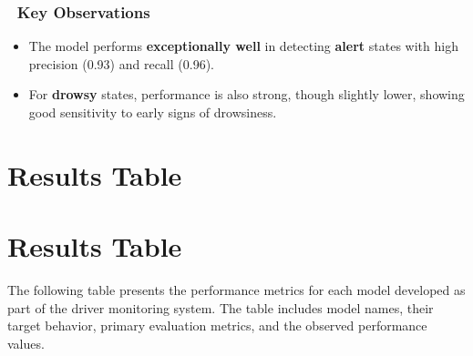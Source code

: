 \documentclass[
  letterpaper,
  DIV=11,
  numbers=noendperiod]{scrreport}
\providecommand{\tightlist}{%
  \setlength{\itemsep}{0pt}\setlength{\parskip}{0pt}}
\begin{document}
\subsubsection{📌 Key Observations}\label{key-observations-1}

\begin{itemize}
\tightlist
\item
  The model performs \textbf{exceptionally well} in detecting
  \textbf{alert} states with high precision (0.93) and recall (0.96).
\item
  For \textbf{drowsy} states, performance is also strong, though
  slightly lower, showing good sensitivity to early signs of drowsiness.
\end{itemize}

\section{Results Table}\label{results-table}

\section{Results Table}\label{results-table-1}

The following table presents the performance metrics for each model
developed as part of the driver monitoring system. The table includes
model names, their target behavior, primary evaluation metrics, and the
observed performance values.
\end{document}
